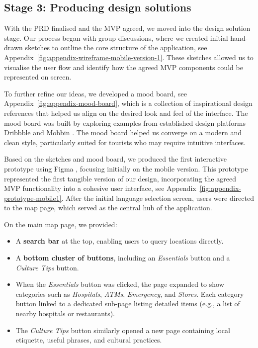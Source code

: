 \subsection{Stage 3: Producing design solutions} 
With the PRD finalised and the MVP agreed, we moved into the design solution stage. Our process began with group discussions, where we created initial hand-drawn sketches to outline the core structure of the application, see Appendix~\ref{fig:appendix-wireframe-mobile-version-1}. These sketches allowed us to visualise the user flow and identify how the agreed MVP components could be represented on screen.  

To further refine our ideas, we developed a mood board, see Appendix~\ref{fig:appendix-mood-board}, which is a collection of inspirational design references that helped us align on the desired look and feel of the interface. The mood board was built by exploring examples from established design platforms Dribbble \cite{dribbble} and Mobbin \cite{mobbin}. The mood board helped us converge on a modern and clean style, particularly suited for tourists who may require intuitive interfaces.

Based on the sketches and mood board, we produced the first interactive prototype using Figma \cite{figma}, focusing initially on the mobile version. This prototype represented the first tangible version of our design, incorporating the agreed MVP functionality into a cohesive user interface, see Appendix~\ref{fig:appendix-prototype-mobile1}. After the initial language selection screen, users were directed to the map page, which served as the central hub of the application.

On the main map page, we provided:
\begin{itemize}
    \item A \textbf{search bar} at the top, enabling users to query locations directly.  
    \item A \textbf{bottom cluster of buttons}, including an \textit{Essentials} button and a \textit{Culture Tips} button.  
    \item When the \textit{Essentials} button was clicked, the page expanded to show categories such as \textit{Hospitals}, \textit{ATMs}, \textit{Emergency}, and \textit{Stores}. Each category button linked to a dedicated sub-page listing detailed items (e.g., a list of nearby hospitals or restaurants).  
    \item The \textit{Culture Tips} button similarly opened a new page containing local etiquette, useful phrases, and cultural practices.  
\end{itemize}


